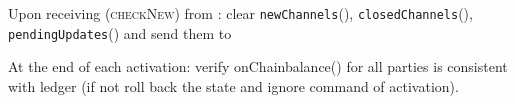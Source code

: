 \begin{functionality}{\fpaynet}
\begin{algorithmic}[1]
    \State Upon receiving (\textsc{checkNew}) from \alice:
    \Indent
      \State clear \texttt{newChannels}(\alice),
      \texttt{closedChannels}(\alice), \texttt{pendingUpdates}(\alice) and send
      them to \alice
    \EndIndent
    \State

    \State At the end of each activation: 
    \Indent
    \State verify  onChainbalance() for all parties is consistent with ledger (if not roll back the state and ignore command of activation).
    \EndIndent
  \end{algorithmic}
\end{functionality}
